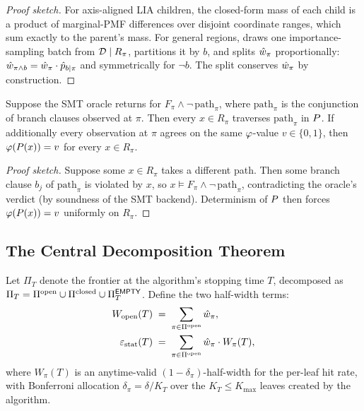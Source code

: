 \begin{proof}[Proof sketch]
  For axis-aligned LIA children, the closed-form mass of each child
  is a product of marginal-PMF differences over disjoint coordinate
  ranges, which sum exactly to the parent's mass.  For general
  regions, \toolname{} draws one importance-sampling batch from
  $\mathcal{D} \mid R_\pi$, partitions it by $b$, and splits $\hat{w}_\pi$
  proportionally: $\hat{w}_{\pi \wedge b} = \hat{w}_\pi \cdot
  \hat{p}_{b \mid \pi}$ and symmetrically for $\neg b$.  The split
  conserves $\hat{w}_\pi$ by construction.
\end{proof}

\begin{lemma}\label{lem:closure-soundness}
  Suppose the SMT oracle returns \unsat{} for
  $F_\pi \wedge \neg\,\mathrm{path}_\pi$, where
  $\mathrm{path}_\pi$ is the conjunction of branch clauses observed
  at $\pi$.  Then every $x \in R_\pi$ traverses
  $\mathrm{path}_\pi$ in $P$.  If additionally every
  observation at $\pi$ agrees on the same $\varphi$-value
  $v \in \{0,1\}$, then $\varphi(P(x)) = v$ for every
  $x \in R_\pi$.
\end{lemma}

\begin{proof}[Proof sketch]
  Suppose some $x \in R_\pi$ takes a different path.  Then some
  branch clause $b_j$ of $\mathrm{path}_\pi$ is violated by $x$,
  so $x \models F_\pi \wedge \neg\,\mathrm{path}_\pi$, contradicting
  the oracle's \unsat{} verdict (by soundness of the SMT backend).
  Determinism of $P$ then forces $\varphi(P(x)) = v$ uniformly
  on $R_\pi$.
\end{proof}

\subsection{The Central Decomposition Theorem}\label{sec:hw-decomp}

Let $\Pi_T$ denote the frontier at the algorithm's stopping time $T$,
decomposed as
$\Pi_T = \Pi^{\mathrm{open}} \cup \Pi^{\mathrm{closed}} \cup \Pi^{\mathsf{EMPTY}}_T$.
Define the two half-width terms:
\begin{align}
  W_{\mathrm{open}}(T) \;&=\; \sum_{\pi \in \Pi^{\mathrm{open}}} \hat{w}_\pi,\\
  \varepsilon_{\mathrm{stat}}(T) \;&=\; \sum_{\pi \in \Pi^{\mathrm{open}}}
    \hat{w}_\pi \cdot W_\pi(T),
\end{align}
where $W_\pi(T)$ is an anytime-valid $(1-\delta_\pi)$-half-width for
the per-leaf hit rate, with Bonferroni allocation
$\delta_\pi = \delta / K_T$ over the $K_T \le K_{\max}$ leaves
created by the algorithm.

